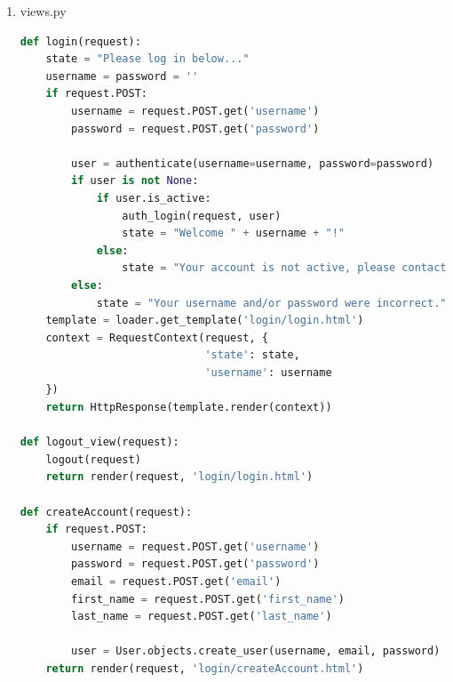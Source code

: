 \documentclass[letterpaper,10pt,onecolumn]{IEEEtran} %
\begin{document}
\begin{enumerate}
\item views.py
\begin{center}
\begin{lstlisting}[language=Python]
def login(request):
    state = "Please log in below..."
    username = password = ''
    if request.POST:
        username = request.POST.get('username')
        password = request.POST.get('password')

        user = authenticate(username=username, password=password)
        if user is not None:
            if user.is_active:
                auth_login(request, user)
                state = "Welcome " + username + "!"
            else:
                state = "Your account is not active, please contact the site admin."
        else:
            state = "Your username and/or password were incorrect."
    template = loader.get_template('login/login.html')
    context = RequestContext(request, {
                             'state': state,
                             'username': username
    })
    return HttpResponse(template.render(context))

def logout_view(request):
    logout(request)
    return render(request, 'login/login.html')

def createAccount(request):
    if request.POST:
        username = request.POST.get('username')
        password = request.POST.get('password')
        email = request.POST.get('email')
        first_name = request.POST.get('first_name')
        last_name = request.POST.get('last_name')

        user = User.objects.create_user(username, email, password)
    return render(request, 'login/createAccount.html')

\end{lstlisting}
\end{center}

\end{enumerate}
\end{document}
